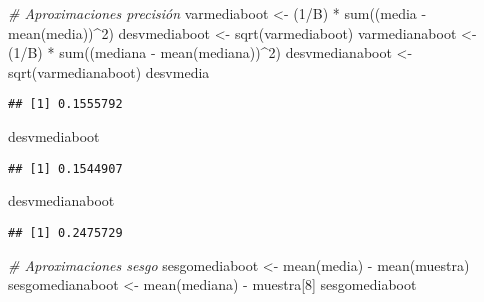 \documentclass[
]{book}
\newenvironment{Shaded}{\begin{snugshade}}{\end{snugshade}}
\newcommand{\CommentTok}[1]{\textcolor[rgb]{0.56,0.35,0.01}{\textit{#1}}}
\newcommand{\DecValTok}[1]{\textcolor[rgb]{0.00,0.00,0.81}{#1}}
\newcommand{\FunctionTok}[1]{\textcolor[rgb]{0.00,0.00,0.00}{#1}}
\newcommand{\NormalTok}[1]{#1}
\newcommand{\OtherTok}[1]{\textcolor[rgb]{0.56,0.35,0.01}{#1}}
\newcommand{\SpecialCharTok}[1]{\textcolor[rgb]{0.00,0.00,0.00}{#1}}
\theoremstyle{break}
\theoremstyle{definition}
\theoremstyle{definition}
\theoremstyle{definition}
\theoremstyle{definition}
\theoremstyle{remark}
\begin{document}
\begin{Shaded}
\begin{Highlighting}[]
\CommentTok{\# Aproximaciones precisión}
\NormalTok{varmediaboot }\OtherTok{\textless{}{-}}\NormalTok{ (}\DecValTok{1}\SpecialCharTok{/}\NormalTok{B) }\SpecialCharTok{*} \FunctionTok{sum}\NormalTok{((media }\SpecialCharTok{{-}} \FunctionTok{mean}\NormalTok{(media))}\SpecialCharTok{\^{}}\DecValTok{2}\NormalTok{)}
\NormalTok{desvmediaboot }\OtherTok{\textless{}{-}} \FunctionTok{sqrt}\NormalTok{(varmediaboot)}
\NormalTok{varmedianaboot }\OtherTok{\textless{}{-}}\NormalTok{ (}\DecValTok{1}\SpecialCharTok{/}\NormalTok{B) }\SpecialCharTok{*} \FunctionTok{sum}\NormalTok{((mediana }\SpecialCharTok{{-}} \FunctionTok{mean}\NormalTok{(mediana))}\SpecialCharTok{\^{}}\DecValTok{2}\NormalTok{)}
\NormalTok{desvmedianaboot }\OtherTok{\textless{}{-}} \FunctionTok{sqrt}\NormalTok{(varmedianaboot)}
\NormalTok{desvmedia}
\end{Highlighting}
\end{Shaded}

\begin{verbatim}
## [1] 0.1555792
\end{verbatim}

\begin{Shaded}
\begin{Highlighting}[]
\NormalTok{desvmediaboot}
\end{Highlighting}
\end{Shaded}

\begin{verbatim}
## [1] 0.1544907
\end{verbatim}

\begin{Shaded}
\begin{Highlighting}[]
\NormalTok{desvmedianaboot}
\end{Highlighting}
\end{Shaded}

\begin{verbatim}
## [1] 0.2475729
\end{verbatim}

\begin{Shaded}
\begin{Highlighting}[]
\CommentTok{\# Aproximaciones sesgo}
\NormalTok{sesgomediaboot }\OtherTok{\textless{}{-}} \FunctionTok{mean}\NormalTok{(media) }\SpecialCharTok{{-}} \FunctionTok{mean}\NormalTok{(muestra)}
\NormalTok{sesgomedianaboot }\OtherTok{\textless{}{-}} \FunctionTok{mean}\NormalTok{(mediana) }\SpecialCharTok{{-}}\NormalTok{ muestra[}\DecValTok{8}\NormalTok{]}
\NormalTok{sesgomediaboot}
\end{Highlighting}
\end{Shaded}
\end{document}
